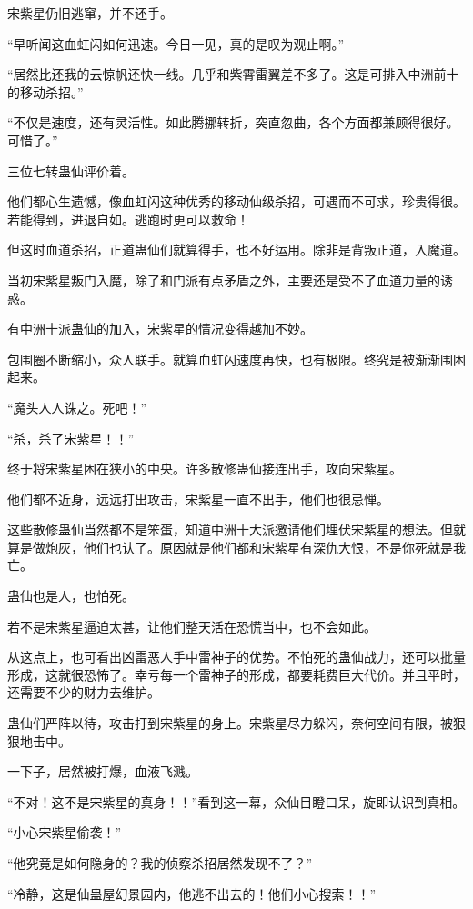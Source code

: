 \begin{this_body}
宋紫星仍旧逃窜，并不还手。

“早听闻这血虹闪如何迅速。今日一见，真的是叹为观止啊。”

“居然比还我的云惊帆还快一线。几乎和紫霄雷翼差不多了。这是可排入中洲前十的移动杀招。”

“不仅是速度，还有灵活性。如此腾挪转折，突直忽曲，各个方面都兼顾得很好。可惜了。”

三位七转蛊仙评价着。

他们都心生遗憾，像血虹闪这种优秀的移动仙级杀招，可遇而不可求，珍贵得很。若能得到，进退自如。逃跑时更可以救命！

但这时血道杀招，正道蛊仙们就算得手，也不好运用。除非是背叛正道，入魔道。

当初宋紫星叛门入魔，除了和门派有点矛盾之外，主要还是受不了血道力量的诱惑。

有中洲十派蛊仙的加入，宋紫星的情况变得越加不妙。

包围圈不断缩小，众人联手。就算血虹闪速度再快，也有极限。终究是被渐渐围困起来。

“魔头人人诛之。死吧！”

“杀，杀了宋紫星！！”

终于将宋紫星困在狭小的中央。许多散修蛊仙接连出手，攻向宋紫星。

他们都不近身，远远打出攻击，宋紫星一直不出手，他们也很忌惮。

这些散修蛊仙当然都不是笨蛋，知道中洲十大派邀请他们埋伏宋紫星的想法。但就算是做炮灰，他们也认了。原因就是他们都和宋紫星有深仇大恨，不是你死就是我亡。

蛊仙也是人，也怕死。

若不是宋紫星逼迫太甚，让他们整天活在恐慌当中，也不会如此。

从这点上，也可看出凶雷恶人手中雷神子的优势。不怕死的蛊仙战力，还可以批量形成，这就很恐怖了。幸亏每一个雷神子的形成，都要耗费巨大代价。并且平时，还需要不少的财力去维护。

蛊仙们严阵以待，攻击打到宋紫星的身上。宋紫星尽力躲闪，奈何空间有限，被狠狠地击中。

一下子，居然被打爆，血液飞溅。

“不对！这不是宋紫星的真身！！”看到这一幕，众仙目瞪口呆，旋即认识到真相。

“小心宋紫星偷袭！”

“他究竟是如何隐身的？我的侦察杀招居然发现不了？”

“冷静，这是仙蛊屋幻景园内，他逃不出去的！他们小心搜索！！”


\end{this_body}
